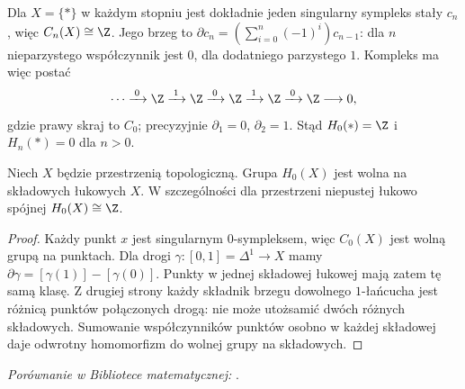 \begin{przyklad}[Punkt]
\label{prz:homologia-punktu}
Dla $X=\{*\}$ w każdym stopniu jest
dokładnie jeden singularny sympleks
stały $c_n$, więc $C_n(X)\cong\Z$.
Jego brzeg to
$\partial c_n=(\sum_{i=0}^n(-1)^i)c_{n-1}$:
dla $n$ nieparzystego współczynnik
jest $0$, dla dodatniego parzystego $1$.
Kompleks ma więc postać
\[
 \cdots\xrightarrow{\;0\;}\Z
 \xrightarrow{\;1\;}\Z
 \xrightarrow{\;0\;}\Z
 \xrightarrow{\;1\;}\Z
 \xrightarrow{\;0\;}\Z\longrightarrow0,
\]
gdzie prawy skraj to $C_0$; precyzyjnie
$\partial_1=0$, $\partial_2=1$.
Stąd $H_0(*)=\Z$ i $H_n(*)=0$ dla $n>0$.
\end{przyklad}

\begin{stwierdzenie}
\label{prop:h0-singularne}
Niech $X$ będzie przestrzenią topologiczną.
Grupa $H_0(X)$ jest wolna na składowych
łukowych $X$. W szczególności
dla przestrzeni niepustej łukowo spójnej
$H_0(X)\cong\Z$.
\end{stwierdzenie}
\begin{proof}
Każdy punkt $x$ jest singularnym
$0$-sympleksem, więc $C_0(X)$
jest wolną grupą na punktach.
Dla drogi $\gamma:[0,1]=\Delta^1\to X$
mamy $\partial\gamma=[\gamma(1)]-
[\gamma(0)]$. Punkty w jednej składowej
łukowej mają zatem tę samą klasę.
Z drugiej strony każdy składnik
brzegu dowolnego $1$-łańcucha
jest różnicą punktów połączonych drogą:
nie może utożsamić dwóch różnych
składowych. Sumowanie współczynników
punktów osobno w każdej składowej
daje odwrotny homomorfizm do
wolnej grupy na składowych.
\end{proof}

\noindent\emph{Porównanie w Bibliotece matematycznej:} .

